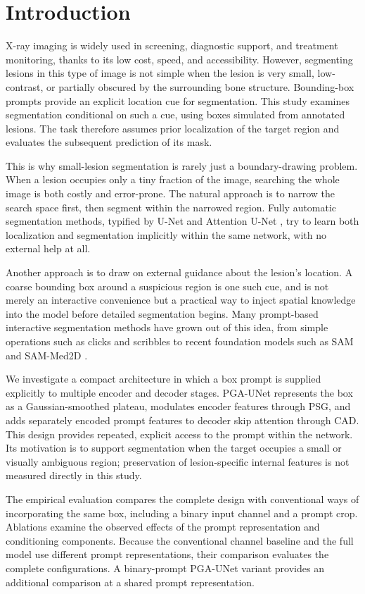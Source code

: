 \section{Introduction}
\label{sec:introduction}
 X-ray imaging is widely used in screening, diagnostic support, and treatment monitoring, thanks to its low cost, speed, and accessibility. However, segmenting lesions in this type of image is not simple when the lesion is very small, low-contrast, or partially obscured by the surrounding bone structure. Bounding-box prompts provide an explicit location cue for segmentation. This study examines segmentation conditional on such a cue, using boxes simulated from annotated lesions. The task therefore assumes prior localization of the target region and evaluates the subsequent prediction of its mask.

This is why small-lesion segmentation is rarely just a boundary-drawing problem. When a lesion occupies only a tiny fraction of the image, searching the whole image is both costly and error-prone. The natural approach is to narrow the search space first, then segment within the narrowed region. Fully automatic segmentation methods, typified by U-Net and Attention U-Net \cite{b3,b4}, try to learn both localization and segmentation implicitly within the same network, with no external help at all.

Another approach is to draw on external guidance about the lesion's location. A coarse bounding box around a suspicious region is one such cue, and is not merely an interactive convenience but a practical way to inject spatial knowledge into the model before detailed segmentation begins. Many prompt-based interactive segmentation methods have grown out of this idea, from simple operations such as clicks and scribbles \cite{b5,b6} to recent foundation models such as SAM and SAM-Med2D \cite{b1,b2}.

We investigate a compact architecture in which a box prompt is supplied explicitly to multiple encoder and decoder stages. PGA-UNet represents the box as a Gaussian-smoothed plateau, modulates encoder features through PSG, and adds separately encoded prompt features to decoder skip attention through CAD. This design provides repeated, explicit access to the prompt within the network. Its motivation is to support segmentation when the target occupies a small or visually ambiguous region; preservation of lesion-specific internal features is not measured directly in this study.

The empirical evaluation compares the complete design with conventional ways of incorporating the same box, including a binary input channel and a prompt crop. Ablations examine the observed effects of the prompt representation and conditioning components. Because the conventional channel baseline and the full model use different prompt representations, their comparison evaluates the complete configurations. A binary-prompt PGA-UNet variant provides an additional comparison at a shared prompt representation.

